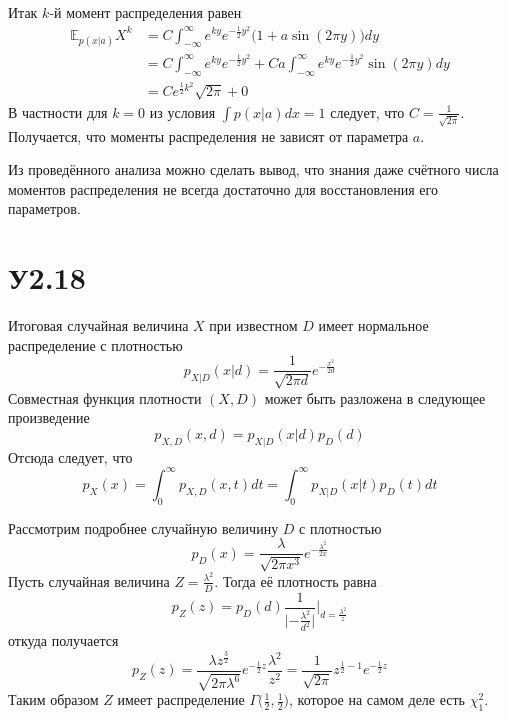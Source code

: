 \documentclass[a4paper]{article}
\newcommand{\ex}[0]{{\mathbb{E}}}
\begin{document}
Итак $k$-й момент распределения равен
\begin{align*}
	\ex_{p(x\rvert a)} X^k
	&= C \int_{-\infty}^\infty e^{ky} e^{-\frac{1}{2}y^2}\bigl(1 + a\sin(2\pi y)\bigr) dy\\
	&= C \int_{-\infty}^\infty e^{ky} e^{-\frac{1}{2}y^2}
		+ C a \int_{-\infty}^\infty e^{ky} e^{-\frac{1}{2}y^2} \sin(2\pi y) dy\\
	&= C e^{\frac{1}{2}k^2} \sqrt{2\pi} + 0
\end{align*}
В частности для $k=0$ из условия $\int p(x\rvert a) dx = 1$ следует, что $C = \frac{1}{\sqrt{2\pi}}$.
Получается, что моменты распределения не зависят от параметра $a$.

Из проведённого анализа можно сделать вывод, что знания даже счётного числа моментов
распределения не всегда достаточно для восстановления его параметров.


\section{У2.18} %
\label{sec:problem_2_18}

Итоговая случайная величина $X$ при известном $D$ имеет нормальное распределение
с плотностью
\[p_{X\rvert D}(x\rvert d) = \frac{1}{\sqrt{ 2\pi d}} e^{-\frac{x^2}{2d}} \]
Совместная функция плотности $(X,D)$ может быть разложена в следующее произведение
\[p_{X,D}(x,d) = p_{X\rvert D}(x\rvert d) p_D(d)\]
Отсюда следует, что 
\[
p_X(x)
= \int_0^\infty p_{X,D}(x,t) dt
= \int_0^\infty p_{X\rvert D}(x\rvert t) p_D(t) dt
\]

Рассмотрим подробнее случайную величину $D$ с плотностью
\[p_D(x) = \frac{\lambda}{\sqrt{2\pi x^3}} e^{-\frac{\lambda^2}{2x}}\]
Пусть случайная величина $Z = \frac{\lambda^2}{D}$. Тогда её плотность равна
\[p_Z(z) = p_D(d) \frac{1}{\lvert -\frac{\lambda^2}{d^2}\rvert}\big\rvert_{d=\frac{\lambda^2}{z}}\]
откуда получается
\[
p_Z(z)
= \frac{\lambda z^\frac{3}{2}}{\sqrt{2\pi \lambda^6}} e^{-\frac{1}{2}z} \frac{\lambda^2}{z^2}
= \frac{1}{\sqrt{2\pi}} z^{\frac{1}{2}-1} e^{-\frac{1}{2}z}
\]
Таким образом $Z$ имеет распределение $\Gamma\bigl(\frac{1}{2},\frac{1}{2}\bigr)$, которое на
самом деле есть $\chi^2_1$.
\end{document}
